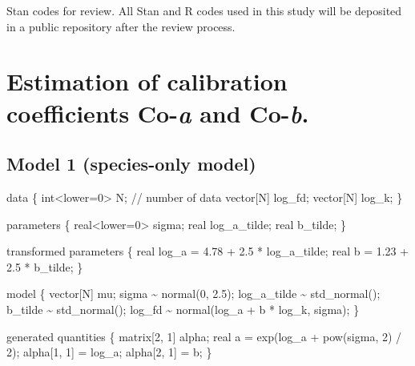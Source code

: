 \documentclass[
  12pt,
  letterpaper,
  DIV=11,
  numbers=noendperiod]{scrartcl}
\author{}
\date{}
\newenvironment{Shaded}{\begin{snugshade}}{\end{snugshade}}
\newcommand{\CommentTok}[1]{\textcolor[rgb]{0.37,0.37,0.37}{#1}}
\newcommand{\DataTypeTok}[1]{\textcolor[rgb]{0.68,0.00,0.00}{#1}}
\newcommand{\DecValTok}[1]{\textcolor[rgb]{0.68,0.00,0.00}{#1}}
\newcommand{\FloatTok}[1]{\textcolor[rgb]{0.68,0.00,0.00}{#1}}
\newcommand{\KeywordTok}[1]{\textcolor[rgb]{0.00,0.23,0.31}{#1}}
\newcommand{\NormalTok}[1]{\textcolor[rgb]{0.00,0.23,0.31}{#1}}
\begin{document}
Stan codes for review. All Stan and R codes used in this study will be
deposited in a public repository after the review process.

\section{\texorpdfstring{Estimation of calibration coefficients
Co-\emph{a} and
Co-\emph{b}.}{Estimation of calibration coefficients Co-a and Co-b.}}\label{estimation-of-calibration-coefficients-co-a-and-co-b.}

\subsection{Model 1 (species-only
model)}\label{model-1-species-only-model}

\begin{Shaded}
\begin{Highlighting}[]
\KeywordTok{data}\NormalTok{ \{}
  \DataTypeTok{int}\NormalTok{\textless{}}\KeywordTok{lower}\NormalTok{=}\DecValTok{0}\NormalTok{\textgreater{} N; }\CommentTok{// number of data}
  \DataTypeTok{vector}\NormalTok{[N] log\_fd;}
  \DataTypeTok{vector}\NormalTok{[N] log\_k;}
\NormalTok{\}}

\KeywordTok{parameters}\NormalTok{ \{}
  \DataTypeTok{real}\NormalTok{\textless{}}\KeywordTok{lower}\NormalTok{=}\DecValTok{0}\NormalTok{\textgreater{} sigma;}
  \DataTypeTok{real}\NormalTok{ log\_a\_tilde;}
  \DataTypeTok{real}\NormalTok{ b\_tilde;}
\NormalTok{\}}

\KeywordTok{transformed parameters}\NormalTok{ \{}
  \DataTypeTok{real}\NormalTok{ log\_a = }\FloatTok{4.78}\NormalTok{ + }\FloatTok{2.5}\NormalTok{ * log\_a\_tilde;}
  \DataTypeTok{real}\NormalTok{ b = }\FloatTok{1.23}\NormalTok{ + }\FloatTok{2.5}\NormalTok{ * b\_tilde;}
\NormalTok{\}}

\KeywordTok{model}\NormalTok{ \{}
  \DataTypeTok{vector}\NormalTok{[N] mu;}
\NormalTok{  sigma \textasciitilde{} normal(}\DecValTok{0}\NormalTok{, }\FloatTok{2.5}\NormalTok{);}
\NormalTok{  log\_a\_tilde \textasciitilde{} std\_normal();}
\NormalTok{  b\_tilde \textasciitilde{} std\_normal();}
\NormalTok{  log\_fd \textasciitilde{} normal(log\_a + b * log\_k, sigma);}
\NormalTok{\}}

\KeywordTok{generated quantities}\NormalTok{ \{}
  \DataTypeTok{matrix}\NormalTok{[}\DecValTok{2}\NormalTok{, }\DecValTok{1}\NormalTok{] alpha;}
  \DataTypeTok{real}\NormalTok{ a = exp(log\_a + pow(sigma, }\DecValTok{2}\NormalTok{) / }\DecValTok{2}\NormalTok{);}
\NormalTok{  alpha[}\DecValTok{1}\NormalTok{, }\DecValTok{1}\NormalTok{] = log\_a;}
\NormalTok{  alpha[}\DecValTok{2}\NormalTok{, }\DecValTok{1}\NormalTok{] = b;}
\NormalTok{\}}
\end{Highlighting}
\end{Shaded}
\end{document}
